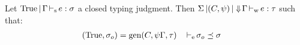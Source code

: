 
\begin{theorem}[Principality]
  Let $\inferS{\Ctrue}{\E}{e}{\schm}$ a closed typing judgment.
  Then $\inferW{\Sv}{(C,\unif)}{\Eflat\E}{e}{\tau}$
  such that:
  \begin{align*}
    (\Ctrue,\schm_o) &= \generalize{C}{\unif\E}{\tau}
    &\entail{&}{\schm_o \preceq \schm}
  \end{align*}


\end{theorem}

